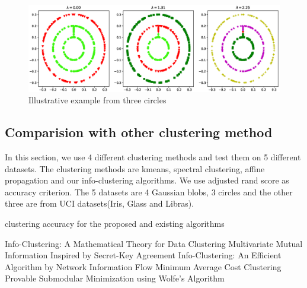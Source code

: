 \documentclass{article}
\theoremstyle{definition}
\begin{document}
\begin{figure}[!ht]
\includegraphics[width=12cm]{pic/3circle.eps}
\caption{Illustrative example from three circles}\label{fig:3c}
\end{figure}
\subsection{Comparision with other clustering method}
In this section, we use 4 different clustering methods and test them on 5 different datasets. The clustering methods are kmeans, spectral clustering, affine propagation and our info-clustering algorithms. We use adjusted rand score as accuracy criterion. The 5 datasets are 4 Gaussian blobs, 3 circles and the other three are from UCI datasets(Iris, Glass and Libras).
\begin{table}[!ht]
\centering

\caption{clustering accuracy for the proposed and existing algorithms}
\end{table}
\begin{thebibliography}{9}
Info-Clustering: A Mathematical Theory for Data Clustering
 Multivariate Mutual Information Inspired by Secret-Key Agreement
 Info-Clustering: An Efficient Algorithm by Network Information Flow
 Minimum Average Cost Clustering
 Provable Submodular Minimization using Wolfe's Algorithm
\end{thebibliography}
\end{document}
